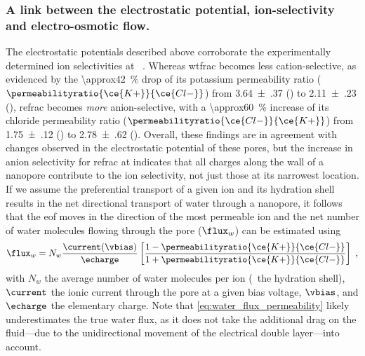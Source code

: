 \subsubsection{A link between the electrostatic potential, ion-selectivity and electro-osmotic flow.}
%
%

The electrostatic potentials described above corroborate the experimentally determined ion selectivities at
~\cite{Huang-2017}. Whereas \gls{wtfrac} becomes less cation-selective, as evidenced by the
\SI{\approx42}{\percent} drop of its potassium permeability ratio ($\permeabilityratio{\ce{K+}}{\ce{Cl-}}$)
from \num{3.64(37)} () to \num{2.11(23)} (), \gls{refrac} becomes \emph{more} anion-selective,
with a \SI{\approx60}{\percent} increase of its chloride permeability ratio
($\permeabilityratio{\ce{Cl-}}{\ce{K+}}$) from \num{1.75(12)} () to \num{2.78(62)} ().
Overall, these findings are in agreement with changes observed in the electrostatic potential of these pores,
but the increase in anion selectivity for \gls{refrac} at  indicates that all charges along the wall
of a nanopore contribute to the ion selectivity, not just those at its narrowest location. If we assume the
preferential transport of a given ion and its hydration shell results in the net directional transport of
water through a nanopore, it follows that the \gls{eof} moves in the direction of the most permeable ion and
the net number of water molecules flowing through the pore ($\flux_{w}$) can be estimated
using~\cite{Piguet-2014}
%
\begin{equation}\label{eq:water_flux_permeability}
  \flux_{w} = N_{w} \dfrac{\current(\vbias)}{\echarge} 
    \left[ \dfrac%
        {1 - \permeabilityratio{\ce{K+}}{\ce{Cl-}}}%
        {1 + \permeabilityratio{\ce{K+}}{\ce{Cl-}}}%
    \right]
    \text{ ,}
\end{equation}
%
with $N_{w}$ the average number of water molecules per ion (\ie~the hydration shell), $\current$ the ionic
current through the pore at a given bias voltage, $\vbias$, and $\echarge$ the elementary charge. Note that
\cref{eq:water_flux_permeability} likely underestimates the true water flux, as it does not take the
additional drag on the fluid---due to the unidirectional movement of the electrical double layer---into
account.


